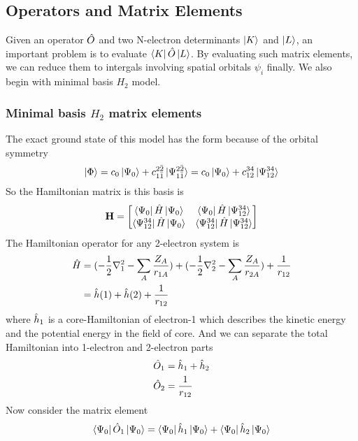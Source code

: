 \documentclass[11pt]{article}
\begin{document}
\subsection{Operators and Matrix Elements}
Given an operator $\Hat{O}$ and two N-electron determinants $\ket{K}$ and $\ket{L}$, an important
problem is to evaluate $\bra{K}\Hat{O}\ket{L}$. By evaluating such matrix elements, we can reduce
them to intergals involving spatial orbitals $\psi_i$ finally. We also begin with minimal basis $H_2$ model.
\subsubsection{Minimal basis $H_2$ matrix elements}
The exact ground state of this model has the form because of the orbital symmetry
\begin{equation}
    \ket{\Phi}=c_0\ket{\Psi_0}+c_{1\bar{1}}^{2\bar{2}}\ket{\Psi_{1\bar{1}}^{2\bar{2}}}=c_0\ket{\Psi_0}+c_{12}^{34}\ket{\Psi_{12}^{34}}
\end{equation}
So the Hamiltonian matrix is this basis is
\begin{equation}
    \mathbf{H}=
    \begin{bmatrix}
        \bra{\Psi_0}\Hat{H}\ket{\Psi_0} & \bra{\Psi_0}\Hat{H}\ket{\Psi_{12}^{34}}\\
        \bra{\Psi_{12}^{34}}\Hat{H}\ket{\Psi_0} & \bra{\Psi_{12}^{34}}\Hat{H}\ket{\Psi_{12}^{34}}
    \end{bmatrix}
\end{equation}
The Hamiltonian operator for any 2-electron system is
\begin{equation}
    \begin{split}
        \Hat{H}&=(-\frac{1}{2}\nabla_1^2-\sum_{A}\frac{Z_A}{r_{1A}})+(-\frac{1}{2}\nabla_2^2-\sum_{A}\frac{Z_A}{r_{2A}})+\frac{1}{r_{12}}\\
        &=\Hat{h}(1)+\Hat{h}(2)+\frac{1}{r_{12}} 
    \end{split}
\end{equation}
where $\Hat{h}_1$ is a core-Hamiltonian of electron-1 which describes the kinetic energy and the potential energy in the field of core. And we
can separate the total Hamiltonian into 1-electron and 2-electron parts
\begin{align}
    \Hat{O}_1&=\Hat{h}_1+\Hat{h}_2\\
    \Hat{O}_2&=\frac{1}{r_{12}}
\end{align}
Now consider the matrix element
\begin{align}
    \bra{\Psi_0}\Hat{O}_1\ket{\Psi_0}=\bra{\Psi_0}\Hat{h}_1\ket{\Psi_0}+\bra{\Psi_0}\Hat{h}_2\ket{\Psi_0}
\end{align}
\end{document}
